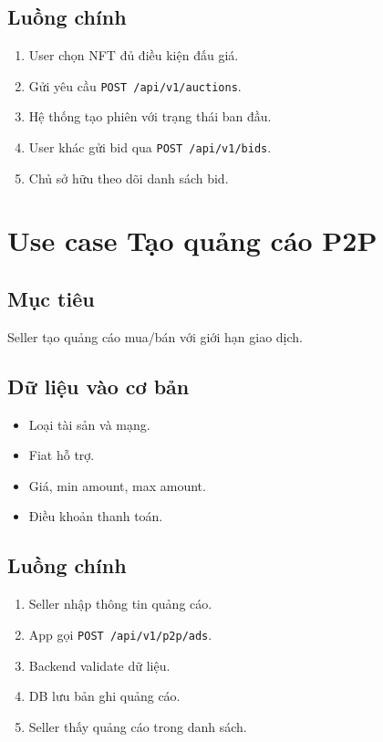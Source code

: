 \documentclass[a4paper,12pt]{report}
\begin{document}
\subsection{Luồng chính}
\begin{enumerate}
    \item User chọn NFT đủ điều kiện đấu giá.
    \item Gửi yêu cầu \texttt{POST /api/v1/auctions}.
    \item Hệ thống tạo phiên với trạng thái ban đầu.
    \item User khác gửi bid qua \texttt{POST /api/v1/bids}.
    \item Chủ sở hữu theo dõi danh sách bid.
\end{enumerate}

\section{Use case Tạo quảng cáo P2P}
\subsection{Mục tiêu}
Seller tạo quảng cáo mua/bán với giới hạn giao dịch.

\subsection{Dữ liệu vào cơ bản}
\begin{itemize}
    \item Loại tài sản và mạng.
    \item Fiat hỗ trợ.
    \item Giá, min amount, max amount.
    \item Điều khoản thanh toán.
\end{itemize}

\subsection{Luồng chính}
\begin{enumerate}
    \item Seller nhập thông tin quảng cáo.
    \item App gọi \texttt{POST /api/v1/p2p/ads}.
    \item Backend validate dữ liệu.
    \item DB lưu bản ghi quảng cáo.
    \item Seller thấy quảng cáo trong danh sách.
\end{enumerate}
\end{document}
